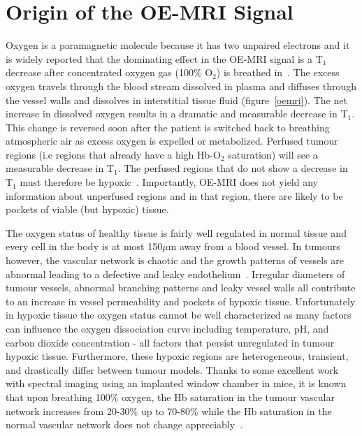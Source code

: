 
 \section{Origin of the OE-MRI Signal}

 Oxygen is a paramagnetic molecule because it has two unpaired electrons and it is widely reported that the dominating effect in the OE-MRI signal is a T$_1$ decrease after concentrated oxygen gas (100\% O$_2$) is breathed in~\cite{OConnor:2016ee,Linnik:2013hf}. 
 The excess oxygen travels through the blood stream dissolved in plasma and diffuses through the vessel walls and dissolves in interstitial tissue fluid (figure~\ref{oemri}).
 The net increase in dissolved oxygen results in a dramatic and measurable decrease in T$_1$. 
 This change is reversed soon after the patient is switched back to breathing atmospheric air as excess oxygen is expelled or metabolized. 
 Perfused tumour regions (i.e regions that already have a high \acs{Hb}-O$_2$ saturation) will see a measurable decrease in T$_1$. 
 The perfused regions that do not show a decrease in T$_1$ must therefore be hypoxic~\cite{OConnor:2016ee}. 
 Importantly, OE-MRI does not yield any information about unperfused regions and in that region, there are likely to be pockets of viable (but hypoxic) tissue.

 The oxygen status of healthy tissue is fairly well regulated in normal tissue and every cell in the body is at most 150$\mu$m away from a blood vessel. 
 In tumours however, the vascular network is chaotic and the growth patterns of vessels are abnormal leading to a defective and leaky endothelium~\cite{McDonald:2002ut}. 
 Irregular diameters of tumour vessels, abnormal branching patterns and leaky vessel walls all contribute to an increase in vessel permeability and pockets of hypoxic tissue. 
 Unfortunately in hypoxic tissue the oxygen status cannot be well characterized as many factors can influence the oxygen dissociation curve including temperature, pH, and carbon dioxide concentration - all factors that persist unregulated in tumour hypoxic tissue. 
 Furthermore, these hypoxic regions are heterogeneous, transient, and drastically differ between tumour models. 
 Thanks to some excellent work with spectral imaging using an implanted window chamber in mice, it is known that upon breathing 100\% oxygen, the \acs{Hb} saturation in the tumour vascular network increases from 20-30\% up to 70-80\% while the \acs{Hb} saturation in the normal vascular network does not change appreciably~\cite{Sorg:2008eg}.

